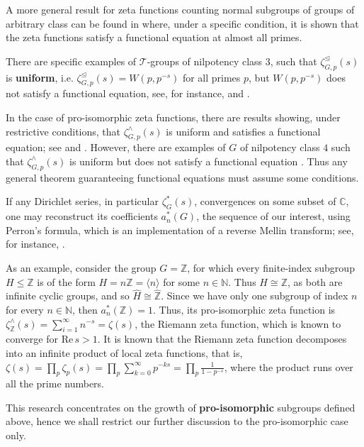 \documentclass[12pt]{article}
\begin{document}
A more general result for zeta functions counting normal subgroups of groups of arbitrary class can be found in \cite[Theorem 1.2]{Voll2} where, under a specific condition, it is shown that the zeta functions satisfy a functional equation at almost all primes.

There are specific examples of $\mathcal{T}$-groups of nilpotency class $3$, such that $\zeta_{G,p}^{\trianglelefteq}(s)$ is \textbf{uniform}, i.e. $\zeta_{G,p}^{\trianglelefteq}(s)=W(p,p^{-s})$ for all primes $p$, but $W(p,p^{-s})$ does not satisfy a functional equation, see, for instance, \cite[Theorem 2.40]{DuSautoyWoodward} and \cite[Theorem 2.44]{DuSautoyWoodward}.

In the case of pro-isomorphic zeta functions, there are results showing, under restrictive conditions, that $\zeta_{G,p}^{\wedge}(s)$ is uniform and satisfies a functional equation; see \cite[Theorem B]{DuSautoyLubotzky} and \cite[Theorem 1.1]{Berman}. However, there are examples of $G$ of nilpotency class $4$ such that $\zeta_{G,p}^{\wedge}(s)$ is uniform but does not satisfy a functional equation \cite[Theorem 1.1]{BermanKlopsch}. Thus any general theorem guaranteeing functional equations must assume some conditions.

If any Dirichlet series, in particular $\zeta_{G}^{\ast}(s)$, convergences on some subset of $\mathbb{C}$, one may reconstruct its coefficients $a_{n}^{\ast}(G)$, the sequence of our interest, using Perron's formula, which is an implementation of a reverse Mellin transform; see, for instance, \cite[Theorem 5.1]{MontgomeryVaughan}.\par
As an example, consider the group $G=\mathbb{Z}$, for which every finite-index subgroup $H\leq{\mathbb{Z}}$ is of the form $H=n\mathbb{Z}=\langle n\rangle$ for some $n\in\mathbb{N}$. Thus $H\cong \mathbb{Z}$, as both are infinite cyclic groups, and so $\widehat{H}\cong\widehat{\mathbb{Z}}$. Since we have only one subgroup of index $n$ for every $n\in\mathbb{N}$, then $a_{n}^{\ast}(\mathbb{Z})=1$. Thus, its pro-isomorphic zeta function is $\zeta_{\mathbb{Z}}^{\wedge}(s)=\sum_{i=1}^{\infty}n^{-s}=\zeta(s)$, the Riemann zeta function, which is known to converge for $\mathrm{Re}\,s>1$. It is known that the Riemann zeta function decomposes into an infinite product of local zeta functions, that is, $\zeta(s)=\prod_p\zeta_p(s)=\prod_p\sum_{k=0}^\infty p^{-ks}=\prod_p\frac{1}{1-p^{-s}}$, where the product runs over all the prime numbers.\par
This research concentrates on the growth of \textbf{pro-isomorphic} subgroups defined above, hence we shall restrict our further discussion to the pro-isomorphic case only.
\end{document}
